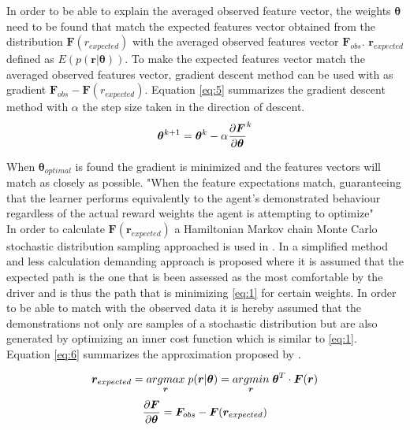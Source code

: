 In order to be able to explain the averaged observed feature vector, the weights $\bm{\theta}$ need to be found that match the expected features vector obtained from the distribution $\bm{F}(r_{expected})$ with the averaged observed features vector $\bm{F}_{obs}$. $\bm{r}_{expected}$ defined as $ E(p(\bm{r}|\bm{\theta}))$. To make the expected features vector match the averaged observed features vector, gradient descent method can be used with as gradient $\bm{F}_{obs} - \bm{F}(r_{expected})$. Equation \ref{eq:5} summarizes the gradient descent method with $\alpha$ the step size taken in the direction of descent.
\begin{equation}\label{eq:5}
	\bm{\theta}^{k+1} = \bm{\theta}^{k} - \alpha \pdv{\bm{F}}{\bm{\theta}}^k 
\end{equation}

When $\bm{\theta}_{optimal}$ is found the gradient is minimized and the features vectors will match as closely as possible. "When the feature expectations match, guaranteeing that the learner performs equivalently to the agent's demonstrated behaviour regardless of the actual reward weights the
agent is attempting to optimize" \cite{Abbeel2004}\\

In order to calculate $\bm{F}(\bm{r}_{expected})$ a Hamiltonian Markov chain
Monte Carlo stochastic distribution sampling approached is used in \cite{Kretzschmar2014}. In \cite{Kuderer2015a} a simplified method and less calculation demanding approach is proposed where it is assumed that the expected path is the one that is been assessed as the most comfortable by the driver and is thus the path that is minimizing \ref{eq:1} for certain weights. In order to be able to match with the observed data it is hereby assumed that the demonstrations not only are samples of a stochastic distribution but are also generated by optimizing an inner cost function which is similar to \ref{eq:1}. Equation \ref{eq:6} summarizes the approximation proposed by \cite{Kuderer2015a}.
\newcommand{\argmax}{argmax}
\newcommand{\argmin}{argmin}

\begin{equation}\label{eq:6}
	\bm{r}_{expected} = \underset{\bm{r}}{\argmax} \hspace{1mm} p(\bm{r}|\bm{\theta}) = \underset{\bm{r}}{\argmin} \hspace{1mm}  \bm{\theta}^T\cdot \bm{F}(\bm{r})
\end{equation}
\begin{equation}\label{eq:new}
	\pdv{\bm{F}}{\bm{\theta}} = \bm{F}_{obs} - \bm{F}(\bm{r}_{expected})
\end{equation}


